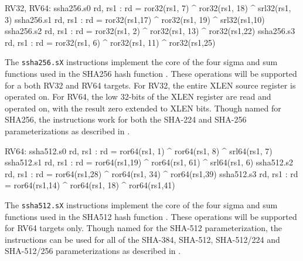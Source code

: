 \begin{cryptoisa}
RV32, RV64:
    ssha256.s0 rd, rs1 : rd = ror32(rs1, 7) ^ ror32(rs1, 18) ^ srl32(rs1, 3)
    ssha256.s1 rd, rs1 : rd = ror32(rs1,17) ^ ror32(rs1, 19) ^ srl32(rs1,10)
    ssha256.s2 rd, rs1 : rd = ror32(rs1, 2) ^ ror32(rs1, 13) ^ ror32(rs1,22)
    ssha256.s3 rd, rs1 : rd = ror32(rs1, 6) ^ ror32(rs1, 11) ^ ror32(rs1,25)
\end{cryptoisa}

The {\tt ssha256.sX}
instructions implement the core of the four sigma and sum functions used in
the SHA256 hash function \cite[Section 4.1.2]{nist:fips:180:4}.
These operations will be supported for a both RV32 and RV64 targets.
For RV32, the entire XLEN source register is operated on.
For RV64, the low 32-bits of the XLEN register are read and operated on,
with the result zero extended to XLEN bits.
Though named for SHA256, the instructions work for both the
SHA-224 and SHA-256 parameterizations as described in
\cite{nist:fips:180:4}.


\begin{cryptoisa}
RV64:
    ssha512.s0 rd, rs1 : rd = ror64(rs1, 1) ^ ror64(rs1,  8) ^ srl64(rs1, 7)
    ssha512.s1 rd, rs1 : rd = ror64(rs1,19) ^ ror64(rs1, 61) ^ srl64(rs1, 6)
    ssha512.s2 rd, rs1 : rd = ror64(rs1,28) ^ ror64(rs1, 34) ^ ror64(rs1,39)
    ssha512.s3 rd, rs1 : rd = ror64(rs1,14) ^ ror64(rs1, 18) ^ ror64(rs1,41)
\end{cryptoisa}

The {\tt ssha512.sX}
instructions implement the core of the four sigma and sum functions used in
the SHA512 hash function \cite[Section 4.1.3]{nist:fips:180:4}.
These operations will be supported for RV64 targets only.
Though named for the SHA-512 parameterization, the instructions
can be used for all of the SHA-384, SHA-512, SHA-512/224 and SHA-512/256
parameterizations as described in \cite{nist:fips:180:4}.



